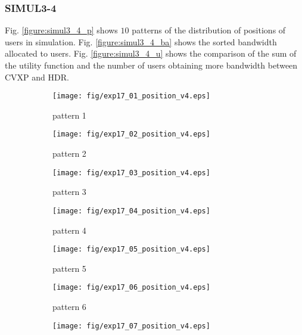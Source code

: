 \subsubsection{SIMUL3-4}
	Fig. \ref{figure:simul3_4_p} shows $10$ patterns of the distribution of positions of users in simulation. Fig. \ref{figure:simul3_4_ba} shows the sorted bandwidth allocated to users. Fig. \ref{figure:simul3_4_u} shows the comparison of the sum of the utility function and the number of users obtaining more bandwidth between CVXP and HDR.

	\begin{figure}
		\begin{center}
			\begin{subfigure}[b]{0.32\textwidth}
				\texttt{[image: fig/exp17\_01\_position\_v4.eps]}
				\caption{pattern 1}
				\label{figure:simul1_1_1_a}
			\end{subfigure}
			\begin{subfigure}[b]{0.32\textwidth}
				\texttt{[image: fig/exp17\_02\_position\_v4.eps]}
				\caption{pattern 2}
				\label{figure:simul1_1_1_b}
			\end{subfigure}
			\begin{subfigure}[b]{0.32\textwidth}
				\texttt{[image: fig/exp17\_03\_position\_v4.eps]}
				\caption{pattern 3}
				\label{figure:simul1_1_1_c}
			\end{subfigure}
			\begin{subfigure}[b]{0.32\textwidth}
				\texttt{[image: fig/exp17\_04\_position\_v4.eps]}
				\caption{pattern 4}
				\label{figure:simul1_1_1_d}
			\end{subfigure}
			\begin{subfigure}[b]{0.32\textwidth}
				\texttt{[image: fig/exp17\_05\_position\_v4.eps]}
				\caption{pattern 5}
				\label{figure:simul1_1_1_e}
			\end{subfigure}
			\begin{subfigure}[b]{0.32\textwidth}
				\texttt{[image: fig/exp17\_06\_position\_v4.eps]}
				\caption{pattern 6}
				\label{figure:simul1_1_1_f}
			\end{subfigure}
			\begin{subfigure}[b]{0.32\textwidth}
				\texttt{[image: fig/exp17\_07\_position\_v4.eps]}

\end{subfigure}
\end{center}
\end{figure}
